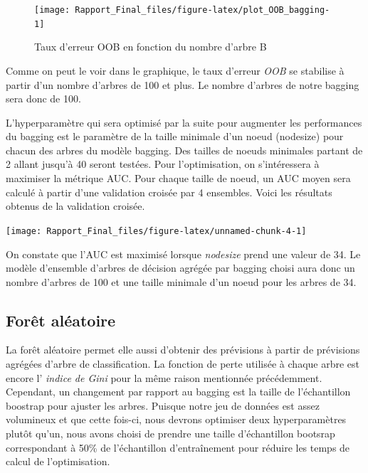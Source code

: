 \documentclass[]{article}
\begin{document}
\begin{figure}

{\centering \texttt{[image: Rapport\_Final\_files/figure-latex/plot\_OOB\_bagging-1]} 

}

\caption{Taux d'erreur OOB en fonction du nombre d'arbre B}\label{fig:plot_OOB_bagging}
\end{figure}

Comme on peut le voir dans le graphique, le taux d'erreur \emph{OOB} se
stabilise à partir d'un nombre d'arbres de 100 et plus. Le nombre
d'arbres de notre bagging sera donc de 100.

\newpage

L'hyperparamètre qui sera optimisé par la suite pour augmenter les
performances du bagging est le paramètre de la taille minimale d'un
noeud (nodesize) pour chacun des arbres du modèle bagging. Des tailles
de noeuds minimales partant de 2 allant jusqu'à 40 seront testées. Pour
l'optimisation, on s'intéressera à maximiser la métrique AUC. Pour
chaque taille de noeud, un AUC moyen sera calculé à partir d'une
validation croisée par 4 ensembles. Voici les résultats obtenus de la
validation croisée.

\begin{center}\texttt{[image: Rapport\_Final\_files/figure-latex/unnamed-chunk-4-1]} \end{center}

On constate que l'AUC est maximisé lorsque \emph{nodesize} prend une
valeur de 34. Le modèle d'ensemble d'arbres de décision agrégée par
bagging choisi aura donc un nombre d'arbres de 100 et une taille
minimale d'un noeud pour les arbres de 34.

\newpage

\subsection{Forêt aléatoire}\label{foruxeat-aluxe9atoire}

La forêt aléatoire permet elle aussi d'obtenir des prévisions à partir
de prévisions agrégées d'arbre de classification. La fonction de perte
utilisée à chaque arbre est encore l' \emph{indice de Gini} pour la même
raison mentionnée précédemment. Cependant, un changement par rapport au
bagging est la taille de l'échantillon boostrap pour ajuster les arbres.
Puisque notre jeu de données est assez volumineux et que cette fois-ci,
nous devrons optimiser deux hyperparamètres plutôt qu'un, nous avons
choisi de prendre une taille d'échantillon bootsrap correspondant à 50\%
de l'échantillon d'entraînement pour réduire les temps de calcul de
l'optimisation.
\end{document}
